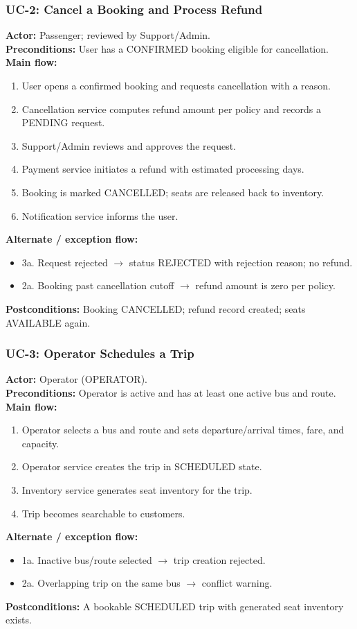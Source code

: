 \documentclass[11pt,a4paper]{article}
\begin{document}
\subsubsection*{UC-2: Cancel a Booking and Process Refund}
\textbf{Actor:} Passenger; reviewed by Support/Admin.\\
\textbf{Preconditions:} User has a CONFIRMED booking eligible for cancellation.\\
\textbf{Main flow:}
\begin{enumerate}[leftmargin=1.6em]
  \item User opens a confirmed booking and requests cancellation with a reason.
  \item Cancellation service computes refund amount per policy and records a PENDING request.
  \item Support/Admin reviews and approves the request.
  \item Payment service initiates a refund with estimated processing days.
  \item Booking is marked CANCELLED; seats are released back to inventory.
  \item Notification service informs the user.
\end{enumerate}
\textbf{Alternate / exception flow:}
\begin{itemize}[leftmargin=1.6em]
  \item 3a. Request rejected $\rightarrow$ status REJECTED with rejection reason; no refund.
  \item 2a. Booking past cancellation cutoff $\rightarrow$ refund amount is zero per policy.
\end{itemize}
\textbf{Postconditions:} Booking CANCELLED; refund record created; seats AVAILABLE again.

\subsubsection*{UC-3: Operator Schedules a Trip}
\textbf{Actor:} Operator (OPERATOR).\\
\textbf{Preconditions:} Operator is active and has at least one active bus and route.\\
\textbf{Main flow:}
\begin{enumerate}[leftmargin=1.6em]
  \item Operator selects a bus and route and sets departure/arrival times, fare, and capacity.
  \item Operator service creates the trip in SCHEDULED state.
  \item Inventory service generates seat inventory for the trip.
  \item Trip becomes searchable to customers.
\end{enumerate}
\textbf{Alternate / exception flow:}
\begin{itemize}[leftmargin=1.6em]
  \item 1a. Inactive bus/route selected $\rightarrow$ trip creation rejected.
  \item 2a. Overlapping trip on the same bus $\rightarrow$ conflict warning.
\end{itemize}
\textbf{Postconditions:} A bookable SCHEDULED trip with generated seat inventory exists.
\end{document}
